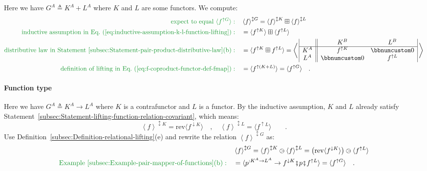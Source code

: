 Here we have $G^{A}\triangleq K^{A}+L^{A}$ where $K$ and $L$ are
some functors. We compute:
\begin{align*}
{\color{greenunder}\text{expect to equal }\langle f^{\uparrow G}\rangle:}\quad & \left<f\right>^{\updownarrow G}=\left<f\right>^{\updownarrow K}\boxplus\left<f\right>^{\updownarrow L}\\
{\color{greenunder}\text{inductive assumption in Eq.~(\ref{eq:inductive-assumption-k-l-function-lifting})}:}\quad & =\langle f^{\uparrow K}\rangle\boxplus\langle f^{\uparrow L}\rangle\\
{\color{greenunder}\text{distributive law in Statement~\ref{subsec:Statement-pair-product-distributive-law}(b)}:}\quad & =\langle f^{\uparrow K}\boxplus f^{\uparrow L}\rangle=\bigg<\,\begin{array}{|c||cc|}
 & K^{B} & L^{B}\\
\hline K^{A} & f^{\uparrow K} & \bbnum 0\\
L^{A} & \bbnum 0 & f^{\uparrow L}
\end{array}\,\bigg>\\
{\color{greenunder}\text{definition of lifting in Eq.~(\ref{eq:f-coproduct-functor-def-fmap})}:}\quad & =\langle f^{\uparrow(K+L)}\rangle=\langle f^{\uparrow G}\rangle\quad.
\end{align*}


\paragraph{Function type}

Here we have $G^{A}\triangleq K^{A}\rightarrow L^{A}$ where $K$
is a contrafunctor and $L$ is a functor. By the inductive assumption,
$K$ and $L$ already satisfy Statement~\ref{subsec:Statement-lifting-function-relation-covariant},
which means:
\[
\left<f\right>^{\updownarrow K}=\text{rev}\langle f^{\downarrow K}\rangle\quad,\quad\left<f\right>^{\updownarrow L}=\langle f^{\uparrow L}\rangle\quad\quad.
\]
 Use Definition~\ref{subsec:Definition-relational-lifting}(e) and
rewrite the relation $\left<f\right>^{\updownarrow G}$ as:
\begin{align*}
 & \left<f\right>^{\updownarrow G}=\left<f\right>^{\updownarrow K}\ogreaterthan\left<f\right>^{\updownarrow L}=\big(\text{rev}\langle f^{\downarrow K}\rangle\big)\ogreaterthan\langle f^{\uparrow L}\rangle\\
{\color{greenunder}\text{Example~\ref{subsec:Example-pair-mapper-of-functions}(b)}:}\quad & =\langle p^{:K^{A}\rightarrow L^{A}}\rightarrow f^{\downarrow K}\bef p\bef f^{\uparrow L}\rangle=\langle f^{\uparrow G}\rangle\quad.
\end{align*}


